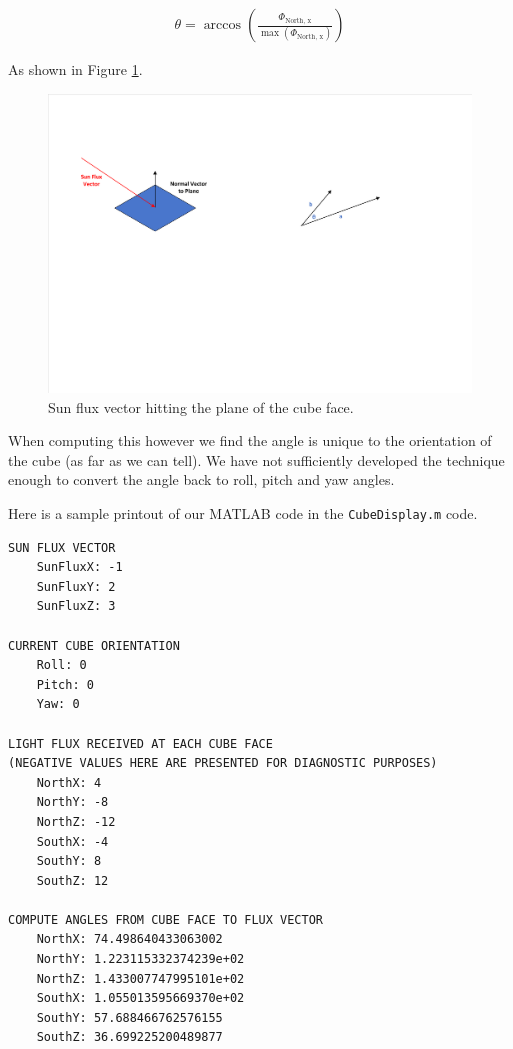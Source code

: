\documentclass[10pt, letterpaper]{article}
\begin{document}
\begin{align*}
    \theta = \arccos{\left( \frac{\Phi_{\text{North, x}}}{\max{(\Phi_{\text{North, x}})}} \right)}
\end{align*}

As shown in Figure \ref{fig:VectorNormaltoPlaneDiagram}.

\begin{figure}[H]
	\centering
	\includegraphics[scale=1]{VectorNormaltoPlaneDiagram.pdf}
    \caption{Sun flux vector hitting the plane of the cube face.}
    \label{fig:VectorNormaltoPlaneDiagram}
\end{figure}

When computing this however we find the angle is unique to the orientation of the cube (as far as we can tell). We have not sufficiently developed the technique enough to convert the angle back to roll, pitch and yaw angles.

Here is a sample printout of our MATLAB code in the \texttt{CubeDisplay.m} code.

\begin{verbatim}
SUN FLUX VECTOR
    SunFluxX: -1
    SunFluxY: 2
    SunFluxZ: 3

CURRENT CUBE ORIENTATION
    Roll: 0
    Pitch: 0
    Yaw: 0

LIGHT FLUX RECEIVED AT EACH CUBE FACE
(NEGATIVE VALUES HERE ARE PRESENTED FOR DIAGNOSTIC PURPOSES)
    NorthX: 4
    NorthY: -8
    NorthZ: -12
    SouthX: -4
    SouthY: 8
    SouthZ: 12

COMPUTE ANGLES FROM CUBE FACE TO FLUX VECTOR
    NorthX: 74.498640433063002
    NorthY: 1.223115332374239e+02
    NorthZ: 1.433007747995101e+02
    SouthX: 1.055013595669370e+02
    SouthY: 57.688466762576155
    SouthZ: 36.699225200489877
\end{verbatim}
\end{document}

